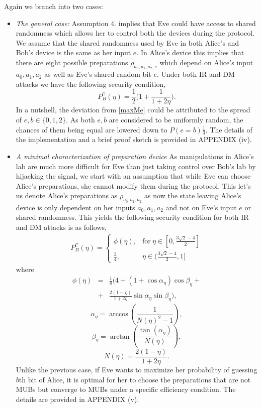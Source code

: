 \documentclass[smallextended]{svjour3}
\newcommand{\be}{\begin{eqnarray}}
\newcommand{\ee}{\end{eqnarray}}
\begin{document}
Again we branch into two cases:
\begin{itemize}
\item \textit{The general case:}  Assumption 4. implies that Eve could have access to shared randomness which allows her to control both the devices during the protocol. We assume that the shared randomness used by Eve in both Alice's and Bob's device is the same as her input $e$. In Alice's device this implies that there are eight possible preparations $\rho_{a_0,a_1,a_2,e}$ which depend on Alice's input $a_0,a_1,a_2$ as well as Eve's shared random bit $e$.
Under both IR and DM attacks we have the following security condition,
\begin{equation} \label{3to1max}
P_B^{\mathcal{C}}(\eta)=\frac{1}{2}\bigg( 1 + \frac{1}{1+2\eta}  \bigg).
\end{equation}
In a nutshell, the deviation from \eqref{maxMe} could be attributed to the spread of $e,b\in \{0,1,2\}$. As both $e,b$ are considered to be uniformly random, the chances of them being equal are lowered down to  $P(e=b)\frac{1}{3}$.  
The details of the implementation and a brief proof sketch is provided in APPENDIX (iv).

\item \textit{A minimal characterization of preparation device} As manipulations in Alice's lab are much more difficult for Eve than just taking control over Bob's lab by hijacking the signal, we start with an assumption that while Eve can choose Alice's preparations, she cannot modify them during the protocol. 
This let's us denote Alice's preparations as $\rho_{a_0,a_1,a_2}$ as now the state leaving Alice's device is only dependent on her inputs $a_0,a_1,a_2$ and not on Eve's input $e$ or shared randomness. This yields the following security condition for both IR and DM attacks is as follows, 
\be
P_B^{\mathcal{C}}(\eta)=
\begin{cases}
\phi(\eta), & \text{for}\ \eta \in [0,\frac{3\sqrt{2}-4}{2}]\\
\frac{3}{4}, & \eta \in (\frac{3\sqrt{2}-4}{2},1] \label{max3to1res}
\end{cases}
\ee
where
\be \nonumber
\phi(\eta)&=&\frac{1}{8}\Big(4+(1+\cos \alpha_\eta)\cos\beta_\eta+ \nonumber\\  &+&\frac{2(1-\eta)}{1+2\eta}\sin\alpha_\eta\sin\beta_\eta\Big), \label{e4} \nonumber
\ee
\begin{equation} \nonumber
\alpha_\eta=\arccos\left(\frac{1}{N(\eta)^2-1}\right),
\end{equation}
\begin{equation} \nonumber
\beta_\eta=\arctan\left(\frac{\tan(\alpha_\eta)}{N(\eta)}\right),
\end{equation}
\begin{equation}
N(\eta)=\frac{2(1-\eta)}{1+2\eta}.
\end{equation}
Unlike the previous case, if Eve wants to maximize her probability of guessing $b$th bit of Alice, it is optimal for her to choose the preparations that are not MUBs but converge to MUBs under a specific efficiency condition. 
The details are provided in APPENDIX (v).
\end{itemize}
\end{document}
